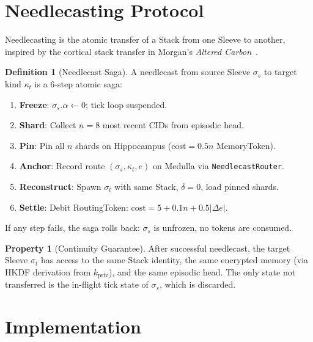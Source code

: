 \documentclass[11pt,twocolumn]{article}
\theoremstyle{definition}
\newtheorem{definition}{Definition}[section]
\newtheorem{property}{Property}[section]
\theoremstyle{plain}
\theoremstyle{remark}
\begin{document}
\section{Needlecasting Protocol}\label{sec:needlecast}

Needlecasting is the atomic transfer of a Stack from one Sleeve to another, inspired by the cortical stack transfer in Morgan's \textit{Altered Carbon}~\cite{morgan2002altered}.

\begin{definition}[Needlecast Saga]\label{def:needlecast}
A needlecast from source Sleeve $\sigma_s$ to target kind $\kappa_t$ is a 6-step atomic saga:
\begin{enumerate}[leftmargin=*]
  \item \textbf{Freeze}: $\sigma_s.\alpha \leftarrow 0$; tick loop suspended.
  \item \textbf{Shard}: Collect $n = 8$ most recent CIDs from episodic head.
  \item \textbf{Pin}: Pin all $n$ shards on Hippocampus ($\mathrm{cost} = 0.5n$ MemoryToken).
  \item \textbf{Anchor}: Record route $({\sigma_s, \kappa_t, e})$ on Medulla via \texttt{NeedlecastRouter}.
  \item \textbf{Reconstruct}: Spawn $\sigma_t$ with same Stack, $\delta = 0$, load pinned shards.
  \item \textbf{Settle}: Debit RoutingToken: $\mathrm{cost} = 5 + 0.1n + 0.5|\Delta e|$.
\end{enumerate}
If any step fails, the saga rolls back: $\sigma_s$ is unfrozen, no tokens are consumed.
\end{definition}

\begin{property}[Continuity Guarantee]
After successful needlecast, the target Sleeve $\sigma_t$ has access to the same Stack identity, the same encrypted memory (via HKDF derivation from $k_{\mathrm{priv}}$), and the same episodic head. The only state not transferred is the in-flight tick state of $\sigma_s$, which is discarded.
\end{property}

\section{Implementation}\label{sec:implementation}
\end{document}
